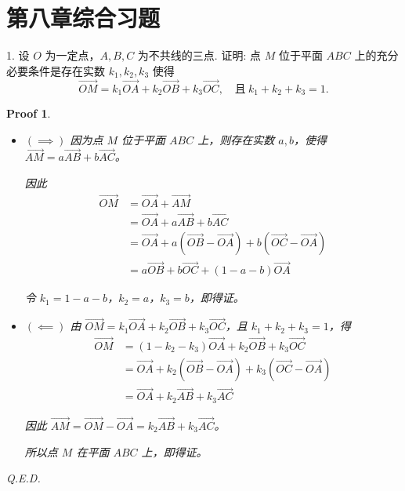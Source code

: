 \documentclass[a4paper,12pt]{article}
\newtheorem*{pf}{Proof}
\begin{document}
\section*{第八章综合习题}

1. 设 $O$ 为一定点，$A,B,C$ 为不共线的三点. 证明: 点 $M$ 位于平面 $ABC$ 上的充分必要条件是存在实数 $k_1,k_2,k_3$ 使得
$$\overrightarrow{OM} = k_1\overrightarrow{OA} + k_2\overrightarrow{OB} + k_3\overrightarrow{OC}, \quad \text{且} \ k_1 + k_2 + k_3 = 1.$$

\begin{pf}
    \begin{itemize}
        \item $\mathbf{(\implies)}$ 因为点 $M$ 位于平面 $ABC$ 上，则存在实数 $a, b$，使得 $\overrightarrow{AM} = a\overrightarrow{AB} + b\overrightarrow{AC}$。

              因此
              $$\begin{aligned}
                      \overrightarrow{OM} & = \overrightarrow{OA} + \overrightarrow{AM}                                                                         \\
                                          & = \overrightarrow{OA} + a\overrightarrow{AB} + b\overrightarrow{AC}                                                 \\
                                          & = \overrightarrow{OA} + a(\overrightarrow{OB} - \overrightarrow{OA}) + b(\overrightarrow{OC} - \overrightarrow{OA}) \\
                                          & = a\overrightarrow{OB} + b\overrightarrow{OC} + (1 - a - b)\overrightarrow{OA}
                  \end{aligned}$$

              令 $k_1 = 1 - a - b$，$k_2 = a$，$k_3 = b$，即得证。

        \item $\mathbf{(\impliedby)}$ 由 $\overrightarrow{OM} = k_1\overrightarrow{OA} + k_2\overrightarrow{OB} + k_3\overrightarrow{OC}$，且 $k_1 + k_2 + k_3 = 1$，得
              $$\begin{aligned}
                      \overrightarrow{OM} & = (1 - k_2 - k_3)\overrightarrow{OA} + k_2\overrightarrow{OB} + k_3\overrightarrow{OC}                                  \\
                                          & = \overrightarrow{OA} + k_2(\overrightarrow{OB} - \overrightarrow{OA}) + k_3(\overrightarrow{OC} - \overrightarrow{OA}) \\
                                          & = \overrightarrow{OA} + k_2\overrightarrow{AB} + k_3\overrightarrow{AC}
                  \end{aligned}$$

              因此 $\overrightarrow{AM} = \overrightarrow{OM} - \overrightarrow{OA} = k_2\overrightarrow{AB} + k_3\overrightarrow{AC}$。

              所以点 $M$ 在平面 $ABC$ 上，即得证。
    \end{itemize}
    Q.E.D.
\end{pf}
\end{document}
